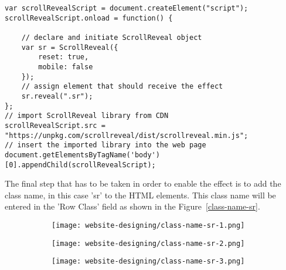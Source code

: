 \begin{lstlisting}
var scrollRevealScript = document.createElement("script");
scrollRevealScript.onload = function() {

    // declare and initiate ScrollReveal object
    var sr = ScrollReveal({
        reset: true,
        mobile: false
    });
    // assign element that should receive the effect
    sr.reveal(".sr");
};
// import ScrollReveal library from CDN
scrollRevealScript.src = "https://unpkg.com/scrollreveal/dist/scrollreveal.min.js";
// insert the imported library into the web page
document.getElementsByTagName('body')[0].appendChild(scrollRevealScript);
\end{lstlisting}

The final step that has to be taken in order to enable the effect is to add the class name, in this case 'sr' to the HTML elements. This class name will be entered in the 'Row Class' field as shown in the Figure~\ref{class-name-sr}.

\begin{figure}[ht]
\caption{Adding Class Name to HTML Element}
\label{class-name-sr}
\centering
	\begin{subfigure}{.49\linewidth}
	\centering
	\texttt{[image: website-designing/class-name-sr-1.png]}
	\end{subfigure}
	\begin{subfigure}{0.49\linewidth}
	\centering
	\texttt{[image: website-designing/class-name-sr-2.png]}
	\end{subfigure}
	\begin{subfigure}{0.49\linewidth}
	\centering
	\texttt{[image: website-designing/class-name-sr-3.png]}
	\end{subfigure}
\end{figure}

